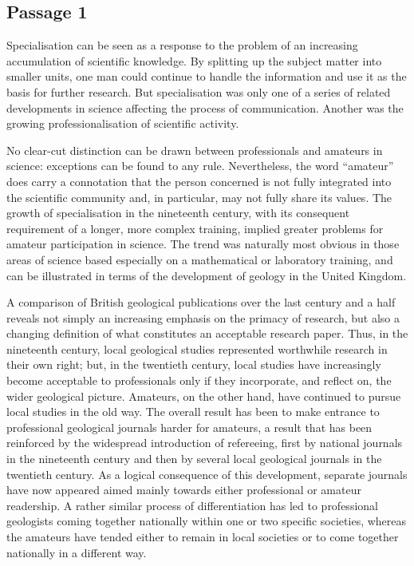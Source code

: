 \newpage

\subsection{Passage 1}

Specialisation can be seen as a response to the problem of an increasing
accumulation of scientific knowledge. By splitting up the subject matter
into smaller units, one man could continue to handle the information and
use it as the basis for further research. But specialisation was only
one of a series of related developments in science affecting the process
of communication. Another was the growing professionalisation of
scientific activity.

No clear-cut distinction can be drawn between professionals and amateurs
in science: exceptions can be found to any rule. Nevertheless, the word ``amateur'' does carry a connotation that the person concerned is not
fully integrated into the scientific community and, in particular, may
not fully share its values. The growth of specialisation in the
nineteenth century, with its consequent requirement of a longer, more
complex training, implied greater problems for amateur participation in
science. The trend was naturally most obvious in those areas of science
based especially on a mathematical or laboratory training, and can be
illustrated in terms of the development of geology in the United
Kingdom.

A comparison of British geological publications over the last century
and a half reveals not simply an increasing emphasis on the primacy of
research, but also a changing definition of what constitutes an
acceptable research paper. Thus, in the nineteenth century, local
geological studies represented worthwhile research in their own right;
but, in the twentieth century, local studies have increasingly become
acceptable to professionals only if they incorporate, and reflect on,
the wider geological picture. Amateurs, on the other hand, have
continued to pursue local studies in the old way. The overall result has
been to make entrance to professional geological journals harder for
amateurs, a result that has been reinforced by the widespread
introduction of refereeing, first by national journals in the nineteenth
century and then by several local geological journals in the twentieth
century. As a logical consequence of this development, separate journals
have now appeared aimed mainly towards either professional or amateur
readership. A rather similar process of differentiation has led to
professional geologists coming together nationally within one or two
specific societies, whereas the amateurs have tended either to remain in
local societies or to come together nationally in a different way.


